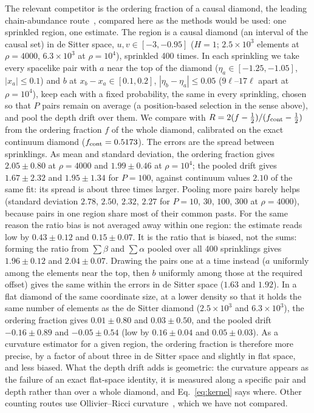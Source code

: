 \documentclass[prd,twocolumn,superscriptaddress,nofootinbib,amsmath,amssymb,floatfix]{revtex4-2}
\begin{document}
The relevant competitor is the ordering fraction of a causal diamond, the leading chain-abundance route~\cite{RSS13}, compared here as the methods would be used: one sprinkled region, one estimate. The region is a causal diamond (an interval of the causal set) in de Sitter space, $u,v\in[-3,-0.95]$ ($H=1$; $2.5\times10^3$ elements at $\rho=4000$, $6.3\times10^3$ at $\rho=10^4$), sprinkled 400 times. In each sprinkling we take every spacelike pair with $a$ near the top of the diamond ($\eta_a\in[-1.25,-1.05]$, $|x_a|\leq0.1$) and $b$ at $x_b-x_a\in[0.1,0.2]$, $|\eta_b-\eta_a|\leq0.05$ ($9\ell$--$17\ell$ apart at $\rho=10^4$), keep each with a fixed probability, the same in every sprinkling, chosen so that $P$ pairs remain on average (a position-based selection in the sense above), and pool the depth drift over them. We compare with $R=2(f-\tfrac12)/(f_{\rm cont}-\tfrac12)$ from the ordering fraction $f$ of the whole diamond, calibrated on the exact continuum diamond ($f_{\rm cont}=0.5173$). The errors are the spread between sprinklings. As mean and standard deviation, the ordering fraction gives $2.05\pm0.80$ at $\rho=4000$ and $1.99\pm0.46$ at $\rho=10^4$; the pooled drift gives $1.67\pm2.32$ and $1.95\pm1.34$ for $P=100$, against continuum values $2.10$ of the same fit: its spread is about three times larger. Pooling more pairs barely helps (standard deviation $2.78$, $2.50$, $2.32$, $2.27$ for $P=10$, $30$, $100$, $300$ at $\rho=4000$), because pairs in one region share most of their common pasts. For the same reason the ratio bias is not averaged away within one region: the estimate reads low by $0.43\pm0.12$ and $0.15\pm0.07$. It is the ratio that is biased, not the sums: forming the ratio from $\sum\beta$ and $\sum\alpha$ pooled over all 400 sprinklings gives $1.96\pm0.12$ and $2.04\pm0.07$. Drawing the pairs one at a time instead ($a$ uniformly among the elements near the top, then $b$ uniformly among those at the required offset) gives the same within the errors in de Sitter space ($1.63$ and $1.92$). In a flat diamond of the same coordinate size, at a lower density so that it holds the same number of elements as the de Sitter diamond ($2.5\times10^3$ and $6.3\times10^3$), the ordering fraction gives $0.01\pm0.80$ and $0.03\pm0.50$, and the pooled drift $-0.16\pm0.89$ and $-0.05\pm0.54$ (low by $0.16\pm0.04$ and $0.05\pm0.03$). As a curvature estimator for a given region, the ordering fraction is therefore more precise, by a factor of about three in de Sitter space and slightly in flat space, and less biased. What the depth drift adds is geometric: the curvature appears as the failure of an exact flat-space identity, it is measured along a specific pair and depth rather than over a whole diamond, and Eq.~\eqref{eq:kernel} says where. Other counting routes use Ollivier--Ricci curvature~\cite{BBR26}, which we have not compared.
\end{document}

